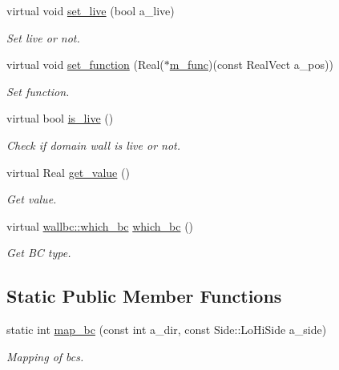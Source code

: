 \begin{DoxyCompactItemize}
virtual void \hyperlink{classwall__bc_a14ae3f4d50edffe2ec14033dc2e985ed}{set\+\_\+live} (bool a\+\_\+live)
\begin{DoxyCompactList}\small\item\em Set live or not. \end{DoxyCompactList}\item 
virtual void \hyperlink{classwall__bc_afc2c813c9e895e3b4adbc787befad41a}{set\+\_\+function} (Real($\ast$\hyperlink{classwall__bc_a16c88bd2a7d2ca3a4e78c465466991c9}{m\+\_\+func})(const Real\+Vect a\+\_\+pos))
\begin{DoxyCompactList}\small\item\em Set function. \end{DoxyCompactList}\item 
virtual bool \hyperlink{classwall__bc_a321b4e487a130afd2e95fcd7cf961631}{is\+\_\+live} ()
\begin{DoxyCompactList}\small\item\em Check if domain wall is live or not. \end{DoxyCompactList}\item 
virtual Real \hyperlink{classwall__bc_a5ede79bd206510ea0612b7220cf4fcb2}{get\+\_\+value} ()
\begin{DoxyCompactList}\small\item\em Get value. \end{DoxyCompactList}\item 
virtual \hyperlink{namespacewallbc_ac79598e478fbcdc07082173cc75d4d99}{wallbc\+::which\+\_\+bc} \hyperlink{classwall__bc_ac604341bc91e99347a72118606a383ed}{which\+\_\+bc} ()
\begin{DoxyCompactList}\small\item\em Get BC type. \end{DoxyCompactList}\end{DoxyCompactItemize}
\subsection*{Static Public Member Functions}
\begin{DoxyCompactItemize}
\item 
static int \hyperlink{classwall__bc_af194818d3a82abc01b64377c67754c2c}{map\+\_\+bc} (const int a\+\_\+dir, const Side\+::\+Lo\+Hi\+Side a\+\_\+side)
\begin{DoxyCompactList}\small\item\em Mapping of bcs. \end{DoxyCompactList}\end{DoxyCompactItemize}

